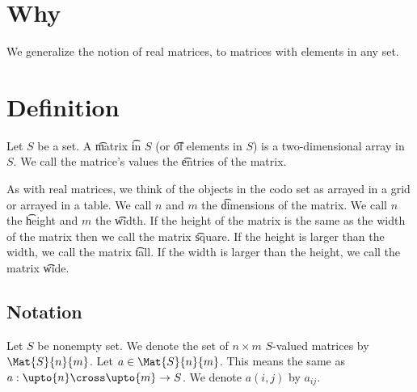 
\section*{Why}

We generalize the notion of real matrices, to matrices with elements in any set.

\section*{Definition}

Let $S$ be a set.
A \t{matrix} \t{in} $S$ (or \t{of} elements in $S$) is a two-dimensional array in $S$.
We call the matrice's values the \t{entries} of the matrix.

As with real matrices, we think of the objects in the codo set as arrayed in a grid or arrayed in a table.
We call $n$ and $m$ the \t{dimensions} of the matrix.
We call $n$ the \t{height} and $m$ the \t{width}.
If the height of the matrix is the same as the width of the matrix then we call the matrix \t{square}.
If the height is larger than the width, we call the matrix \t{tall}.
If the width is larger than the height, we call the matrix \t{wide}.

\subsection*{Notation}

Let $S$ be nonempty set.
We denote the set of $n \times m$ $S$-valued matrices by $\Mat{S}{n}{m}$.
Let $a \in \Mat{S}{n}{m}$.
This means the same as $a: \upto{n} \cross \upto{m} \to S$.
We denote $a(i, j)$ by $a_{ij}$.

\blankpage